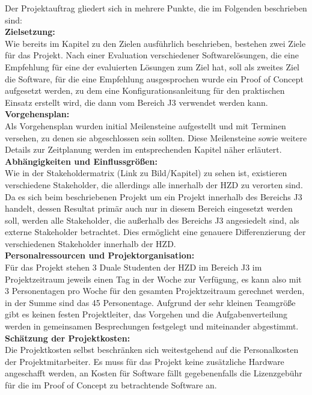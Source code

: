 \documentclass[ThesisDJ.tex]{subfiles}
\begin{document}
	Der Projektauftrag gliedert sich in mehrere Punkte, die im Folgenden beschrieben sind:\bigskip\\
	\textbf{Zielsetzung:}\medskip\\
	Wie bereits im Kapitel zu den Zielen ausführlich beschrieben, bestehen zwei Ziele für das Projekt. Nach einer Evaluation verschiedener Softwarelösungen, die eine Empfehlung für eine der evaluierten Lösungen zum Ziel hat, soll als zweites Ziel die Software, für die eine Empfehlung ausgesprochen wurde ein Proof of Concept aufgesetzt werden, zu dem eine Konfigurationsanleitung für den praktischen Einsatz erstellt wird, die dann vom Bereich J3 verwendet werden kann.\bigskip\\
	\textbf{Vorgehensplan:}\medskip\\
	Als Vorgehensplan wurden initial Meilensteine aufgestellt und mit Terminen versehen, zu denen sie abgeschlossen sein sollten. Diese Meilensteine sowie weitere Details zur Zeitplanung werden im entsprechenden Kapitel näher erläutert.\bigskip\\
	\textbf{Abhängigkeiten und Einflussgrößen:}	\medskip\\
	Wie in der Stakeholdermatrix (Link zu Bild/Kapitel) zu sehen ist, existieren verschiedene Stakeholder, die allerdings alle innerhalb der HZD zu verorten sind. Da es sich beim beschriebenen Projekt um ein Projekt innerhalb des Bereichs J3 handelt, dessen Resultat primär auch nur in diesem Bereich eingesetzt werden soll, werden alle Stakeholder, die außerhalb des Bereichs J3 angesiedelt sind, als externe Stakeholder betrachtet. Dies ermöglicht eine genauere Differenzierung der verschiedenen Stakeholder innerhalb der HZD.\bigskip\\
	\textbf{Personalressourcen und Projektorganisation:}\medskip\\
	Für das Projekt stehen 3 Duale Studenten der HZD im Bereich J3 im Projektzeitraum jeweils einen Tag in der Woche zur Verfügung, es kann also mit 3 Personentagen pro Woche für den gesamten Projektzeitraum gerechnet werden, in der Summe sind das 45 Personentage.
	Aufgrund der sehr kleinen Teamgröße gibt es keinen festen Projektleiter, das Vorgehen und die Aufgabenverteilung werden in gemeinsamen Besprechungen festgelegt und miteinander abgestimmt.\bigskip\\
	\textbf{Schätzung der Projektkosten:}\medskip\\
	Die Projektkosten selbst beschränken sich weitestgehend auf die Personalkosten der Projektmitarbeiter.
	Es muss für das Projekt keine zusätzliche Hardware angeschafft werden, an Kosten für Software fällt gegebenenfalls die Lizenzgebühr für die im Proof of Concept zu betrachtende Software an.\bigskip\\
\end{document}
